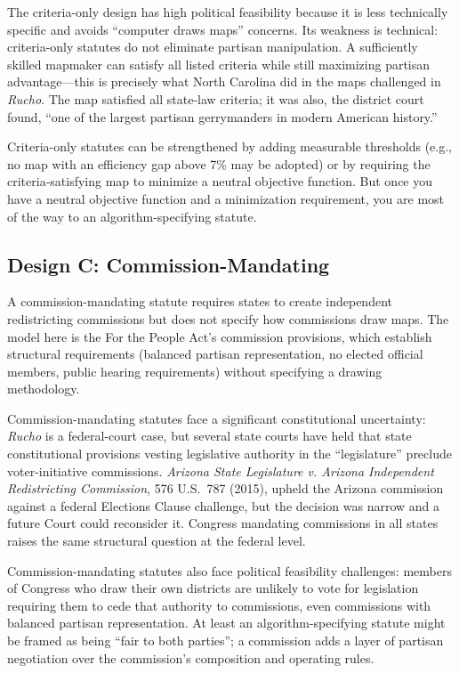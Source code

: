The criteria-only design has high political feasibility because it is less technically specific and avoids ``computer draws maps'' concerns. Its weakness is technical: criteria-only statutes do not eliminate partisan manipulation. A sufficiently skilled mapmaker can satisfy all listed criteria while still maximizing partisan advantage---this is precisely what North Carolina did in the maps challenged in \textit{Rucho}. The map satisfied all state-law criteria; it was also, the district court found, ``one of the largest partisan gerrymanders in modern American history.''

Criteria-only statutes can be strengthened by adding measurable thresholds (e.g., no map with an efficiency gap above 7\% may be adopted) or by requiring the criteria-satisfying map to minimize a neutral objective function. But once you have a neutral objective function and a minimization requirement, you are most of the way to an algorithm-specifying statute.

\subsection{Design C: Commission-Mandating}

A commission-mandating statute requires states to create independent redistricting commissions but does not specify how commissions draw maps. The model here is the For the People Act's commission provisions, which establish structural requirements (balanced partisan representation, no elected official members, public hearing requirements) without specifying a drawing methodology.

Commission-mandating statutes face a significant constitutional uncertainty: \textit{Rucho} is a federal-court case, but several state courts have held that state constitutional provisions vesting legislative authority in the ``legislature'' preclude voter-initiative commissions. \textit{Arizona State Legislature v. Arizona Independent Redistricting Commission}, 576 U.S.\ 787 (2015), upheld the Arizona commission against a federal Elections Clause challenge, but the decision was narrow and a future Court could reconsider it. Congress mandating commissions in all states raises the same structural question at the federal level.

Commission-mandating statutes also face political feasibility challenges: members of Congress who draw their own districts are unlikely to vote for legislation requiring them to cede that authority to commissions, even commissions with balanced partisan representation. At least an algorithm-specifying statute might be framed as being ``fair to both parties''; a commission adds a layer of partisan negotiation over the commission's composition and operating rules.

